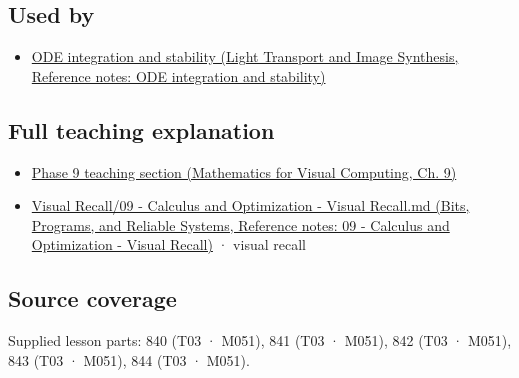 \subsection{Used by}\label{appendix-8f96f9c4d5bc-used-by}

\hypertarget{appendix-8f96f9c4d5bc-used-by}{}

\begin{itemize}
\tightlist
\item
  \href{../04-Light-Transport-and-Image-Synthesis/main.pdf\#nameddest=appendix-18eacf61a04b}{ODE integration and stability (Light Transport and Image Synthesis, Reference notes: ODE integration and stability)}
\end{itemize}

\subsection{Full teaching explanation}\label{appendix-8f96f9c4d5bc-full-teaching-explanation}

\hypertarget{appendix-8f96f9c4d5bc-full-teaching-explanation}{}

\begin{itemize}
\tightlist
\item
  \href{../02-Mathematics-for-Visual-Computing/main.pdf\#nameddest=02-foundations-ii-ch025-odes-and-numerical-simulation}{Phase 9 teaching section (Mathematics for Visual Computing, Ch. 9)}
\item
  \href{../01-Bits-Programs-and-Reliable-Systems/main.pdf\#nameddest=appendix-adf48f5dc5c1}{Visual Recall/09 - Calculus and Optimization - Visual Recall.md (Bits, Programs, and Reliable Systems, Reference notes: 09 - Calculus and Optimization - Visual Recall)} · visual recall
\end{itemize}

\subsection{Source coverage}\label{appendix-8f96f9c4d5bc-source-coverage}

\hypertarget{appendix-8f96f9c4d5bc-source-coverage}{}

Supplied lesson parts: 840 (T03 · M051), 841 (T03 · M051), 842 (T03 · M051), 843 (T03 · M051), 844 (T03 · M051).

